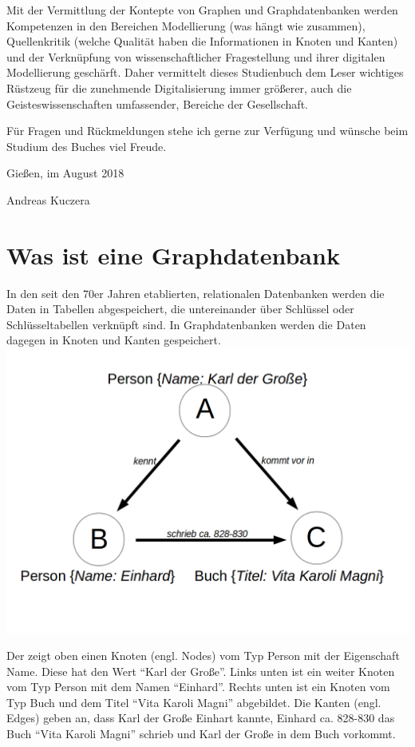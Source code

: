 \documentclass[ngerman,]{scrreprt}
\begin{document}
Mit der Vermittlung der Kontepte von Graphen und Graphdatenbanken werden Kompetenzen in den Bereichen Modellierung (was hängt wie zusammen), Quellenkritik (welche Qualität haben die Informationen in Knoten und Kanten) und der Verknüpfung von wissenschaftlicher Fragestellung und ihrer digitalen Modellierung geschärft. Daher vermittelt dieses Studienbuch dem Leser wichtiges Rüstzeug für die zunehmende Digitalisierung immer größerer, auch die Geisteswissenschaften umfassender, Bereiche der Gesellschaft.

Für Fragen und Rückmeldungen stehe ich gerne zur Verfügung und wünsche beim Studium des Buches viel Freude.

Gießen, im August 2018

Andreas Kuczera

\chapter{Was ist eine Graphdatenbank}\label{was-ist-eine-graphdatenbank}

In den seit den 70er Jahren etablierten, relationalen Datenbanken werden die Daten in Tabellen abgespeichert, die untereinander über Schlüssel oder Schlüsseltabellen verknüpft sind. In Graphdatenbanken werden die Daten dagegen in Knoten und Kanten gespeichert. \includegraphics{Bilder/Beispielgraph.png}

Der zeigt oben einen Knoten (engl. Nodes) vom Typ Person mit der Eigenschaft Name. Diese hat den Wert ``Karl der Große''. Links unten ist ein weiter Knoten vom Typ Person mit dem Namen ``Einhard''. Rechts unten ist ein Knoten vom Typ Buch und dem Titel ``Vita Karoli Magni'' abgebildet. Die Kanten (engl. Edges) geben an, dass Karl der Große Einhart kannte, Einhard ca. 828-830 das Buch ``Vita Karoli Magni'' schrieb und Karl der Große in dem Buch vorkommt.
\end{document}
